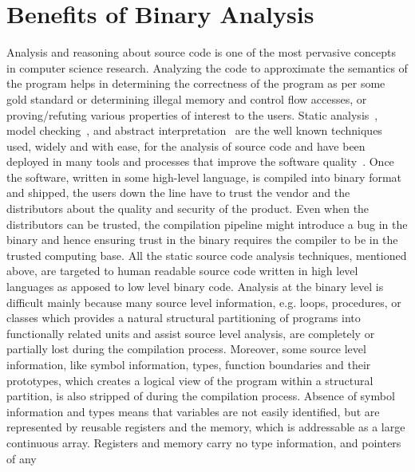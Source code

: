 \section{Benefits of Binary Analysis}\label{sec:ba}
Analysis and reasoning about source code is one of the most pervasive concepts
in computer science research. Analyzing the code to approximate  the semantics
of the program helps in determining the correctness of the program as per some
gold standard or determining illegal memory and control flow accesses, or
proving/refuting various properties of interest to the users. Static
analysis~\cite{Nielson2010}, model checking~\cite{Clarke1981,Queille1982}, and
abstract interpretation~\cite{Cousot1977} are the well known techniques used,
         widely and with ease, for the  analysis of source code and have been
         deployed in many tools and processes that improve the software
         quality~\cite{Xie:2003,Musuvathi:2008,Ivancic:2005,Dwyer:2007,Binkley:2007,Bessey2010,Ball2006}.
         Once the software, written in some high-level language, is compiled
         into binary format and shipped, the users down the line have to trust
         the vendor and the distributors about the quality and security of the
         product. Even when the distributors can be trusted, the compilation
         pipeline might introduce a bug in the binary and hence ensuring trust
         in the binary requires the compiler to be in the trusted computing
         base.  All the static source code analysis techniques, mentioned
         above, are targeted to human readable source code written in high
         level languages as apposed to low level binary code. Analysis at the
         binary level is difficult mainly because many source level
         information, e.g. loops, procedures, or classes which provides a
         natural structural partitioning of programs into functionally related
         units and assist source level analysis, are completely or partially
         lost during the compilation process. Moreover, some source level
         information, like symbol information, types, function boundaries and
         their prototypes, which creates a logical view of the program  within
         a structural partition, is also stripped of during the compilation
         process. Absence of symbol information and types means that variables
         are not easily identified, but are represented by reusable registers
         and the memory, which is addressable as a large continuous array.
         Registers and memory carry no type information, and pointers of any
